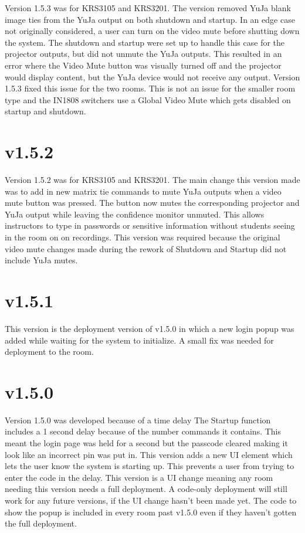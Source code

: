 \documentclass{article}
\begin{document}
Version 1.5.3 was for KRS3105 and KRS3201. The version removed YuJa blank image ties from the YuJa output on both shutdown and
startup. In an edge case not originally considered, a user can turn on the video mute before shutting down the system. The 
shutdown and startup were set up to handle this case for the projector outputs, but did not unmute the YuJa outputs. 
This resulted in an error where the Video Mute button was visually turned off and the projector would display content, but the 
YuJa device would not receive any output. Version 1.5.3 fixed this issue for the two rooms. This is not an issue for the smaller 
room type and the IN1808 switchers use a Global Video Mute which gets disabled on startup and shutdown. 

\section*{v1.5.2}

Version 1.5.2 was for KRS3105 and KRS3201. The main change this version made was to add in new matrix tie commands to mute 
YuJa outputs when a video mute button was pressed. The button now mutes the corresponding projector and YuJa output while 
leaving the confidence monitor unmuted. This allows instructors to type in passwords or sensitive information without
students seeing in the room on on recordings. This version was required because the original video mute changes made during 
the rework of Shutdown and Startup did not include YuJa mutes. 

\section*{v1.5.1}

This version is the deployment version of v1.5.0 in which a new login popup was added while waiting for the system to initialize.
A small fix was needed for deployment to the room.  

\section*{v1.5.0}

Version 1.5.0 was developed because of a time delay
The Startup function includes a 1 second delay because of the number commands it contains. This meant the login page was held 
for a second but the passcode cleared making it look like an incorrect pin was put in. This version adds a new UI element which 
lets the user know the system is starting up. This prevents a user from trying to enter the code in the delay. This version is 
a UI change meaning any room needing this version needs a full deployment. A code-only deployment will still work for any future
versions, if the UI change hasn't been made yet. The code to show the popup is included in every room past v1.5.0 even if they 
haven't gotten the full deployment. 
\end{document}
